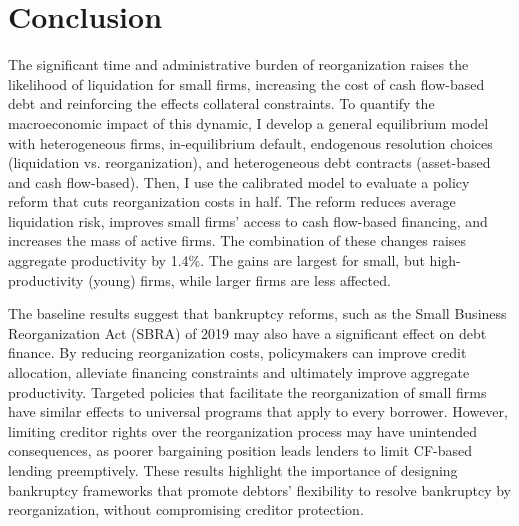 \documentclass[12pt]{article}
\begin{document}
\newpage

\section{Conclusion}

The significant time and administrative burden of reorganization raises the likelihood of liquidation for small firms, increasing the cost of cash flow-based debt and reinforcing the effects collateral constraints. To quantify the macroeconomic impact of this dynamic, I develop a general equilibrium model with heterogeneous firms, in-equilibrium default, endogenous resolution choices (liquidation vs. reorganization), and heterogeneous debt contracts (asset-based and cash flow-based). Then, I use the calibrated model to evaluate a policy reform that cuts reorganization costs in half. The reform reduces average liquidation risk, improves small firms’ access to cash flow-based financing, and increases the mass of active firms. The combination of these changes raises aggregate productivity by 1.4\%. The gains are largest for small, but high-productivity (young) firms, while larger firms are less affected.

The baseline results suggest that bankruptcy reforms, such as the Small Business Reorganization Act (SBRA) of 2019 may also have a significant effect on debt finance. By reducing reorganization costs, policymakers can improve credit allocation, alleviate financing constraints and ultimately improve aggregate productivity. Targeted policies that facilitate the reorganization of small firms have similar effects to universal programs that apply to every borrower. However, limiting creditor rights over the reorganization process may have unintended consequences, as poorer bargaining position leads lenders to limit CF-based lending preemptively. These results highlight the importance of designing bankruptcy frameworks that promote debtors' flexibility to resolve bankruptcy by reorganization, without compromising creditor protection.
\end{document}
